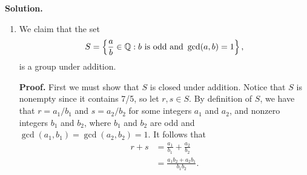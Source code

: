 \begin{enumerate}
      \textbf{Solution.}

      \begin{enumerate}
         \item We claim that the set
               $$S = \left\{\frac{a}{b} \in \mathbb{Q} : b \text{ is odd} \text{ and }
                 \gcd(a, b) = 1\right\},$$
               is a group under addition.

               \textbf{Proof.} First we must show that $S$ is closed under 
               addition. Notice that $S$ is nonempty since it contains 7/5, so 
               let $r, s \in S$. By definition of $S$, we have that
               $r = a_1/b_1$ and $s = a_2/b_2$ for some integers $a_1$ and
               $a_2$, and nonzero integers $b_1$ and $b_2$, where $b_1$ and
               $b_2$ are odd and $\gcd(a_1, b_1) = \gcd(a_2, b_2) = 1$.
               It follows that
               \begin{align*}
                  r + s &= \frac{a_1}{b_1} + \frac{a_2}{b_2} \\
                        &= \frac{a_1b_2 + a_2b_1}{b_1b_2}.
               \end{align*}


\end{enumerate}
\end{enumerate}
